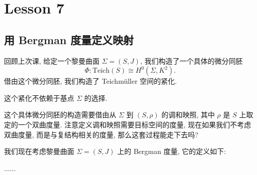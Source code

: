 \section{Lesson 7}

\subsection{用 Bergman 度量定义映射}
回顾上次课, 给定一个黎曼曲面 $\Sigma=(S,J)$, 我们构造了一个具体的微分同胚
\begin{equation*}
    \Phi: \mathrm{Teich}(S)\cong H^0(\Sigma,K^2).
\end{equation*}
借由这个微分同胚, 我们构造了 Teichm\"uller 空间的紧化.
\begin{remark}
    这个紧化不依赖于基点 $\Sigma$ 的选择.
\end{remark}
\begin{remark}
    这个具体微分同胚的构造需要借由从 $\Sigma$ 到 $(S,\rho)$ 的调和映照, 其中 $\rho$ 是
    $S$ 上取定的一个双曲度量. 注意定义调和映照需要目标空间的度量, 现在如果我们不考虑双曲度量, 
    而是与复结构相关的度量, 那么这套过程能走下去吗?
\end{remark}
我们现在考虑黎曼曲面 $\Sigma=(S,J)$ 上的 Bergman 度量, 它的定义如下:

......



